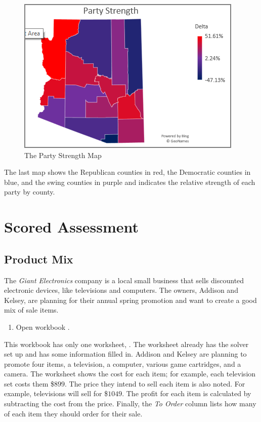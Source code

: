 \begin{figure}[H]
	\centering
	\includegraphics[width=\maxwidth{.95\linewidth}]{gfx/ch08_fig43}
	\caption{The Party Strength Map}
	\label{08:fig43}
\end{figure}

The last map shows the Republican counties in red, the Democratic counties in blue, and the swing counties in purple and indicates the relative strength of each party by county.

\section{Scored Assessment}

\subsection{Product Mix}

The \textit{Giant Electronics} company is a local small business that sells discounted electronic devices, like televisions and computers. The owners, Addison and Kelsey, are planning for their annual spring promotion and want to create a good mix of sale items.

\begin{enumerate}
	\item Open workbook .
\end{enumerate}

This workbook has only one worksheet, . The worksheet already has the solver set up and has some information filled in. Addison and Kelsey are planning to promote four items, a television, a computer, various game cartridges, and a camera. The worksheet shows the cost for each item; for example, each television set costs them \$$ 899 $. The price they intend to sell each item is also noted. For example, televisions will sell for \$$ 1049 $. The profit for each item is calculated by subtracting the cost from the price. Finally, the \textit{To Order} column lists how many of each item they should order for their sale.

